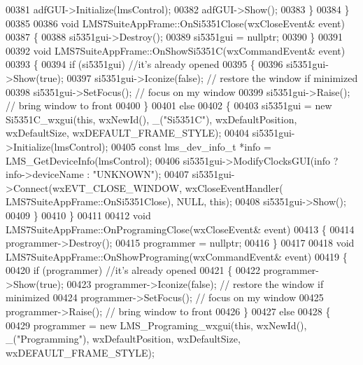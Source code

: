 \begin{DoxyCode}
{{{{00381         adfGUI->Initialize(lmsControl);
00382         adfGUI->Show();
00383     \}
00384 \}
00385 
00386 \textcolor{keywordtype}{void} LMS7SuiteAppFrame::OnSi5351Close(wxCloseEvent& event)
00387 \{
00388     si5351gui->Destroy();
00389     si5351gui = \textcolor{keyword}{nullptr};
00390 \}
00391 
00392 \textcolor{keywordtype}{void} LMS7SuiteAppFrame::OnShowSi5351C(wxCommandEvent& event)
00393 \{
00394     \textcolor{keywordflow}{if} (si5351gui) \textcolor{comment}{//it's already opened}
00395     \{
00396         si5351gui->Show(\textcolor{keyword}{true});
00397         si5351gui->Iconize(\textcolor{keyword}{false}); \textcolor{comment}{// restore the window if minimized}
00398         si5351gui->SetFocus();  \textcolor{comment}{// focus on my window}
00399         si5351gui->Raise();  \textcolor{comment}{// bring window to front}
00400     \}
00401     \textcolor{keywordflow}{else}
00402     \{
00403         si5351gui = \textcolor{keyword}{new} Si5351C_wxgui(\textcolor{keyword}{this}, wxNewId(), \_(\textcolor{stringliteral}{"Si5351C"}), wxDefaultPosition, wxDefaultSize, 
      wxDEFAULT\_FRAME\_STYLE);
00404         si5351gui->Initialize(lmsControl);
00405         \textcolor{keyword}{const} lms_dev_info_t *info = LMS_GetDeviceInfo(lmsControl);
00406         si5351gui->ModifyClocksGUI(info ? info->deviceName : \textcolor{stringliteral}{"UNKNOWN"});
00407         si5351gui->Connect(wxEVT\_CLOSE\_WINDOW, wxCloseEventHandler(
      LMS7SuiteAppFrame::OnSi5351Close), NULL, \textcolor{keyword}{this});
00408         si5351gui->Show();
00409     \}
00410 \}
00411 
00412 \textcolor{keywordtype}{void} LMS7SuiteAppFrame::OnProgramingClose(wxCloseEvent& event)
00413 \{
00414     programmer->Destroy();
00415     programmer = \textcolor{keyword}{nullptr};
00416 \}
00417 
00418 \textcolor{keywordtype}{void} LMS7SuiteAppFrame::OnShowPrograming(wxCommandEvent& event)
00419 \{
00420     \textcolor{keywordflow}{if} (programmer) \textcolor{comment}{//it's already opened}
00421     \{
00422         programmer->Show(\textcolor{keyword}{true});
00423         programmer->Iconize(\textcolor{keyword}{false}); \textcolor{comment}{// restore the window if minimized}
00424         programmer->SetFocus();  \textcolor{comment}{// focus on my window}
00425         programmer->Raise();  \textcolor{comment}{// bring window to front}
00426     \}
00427     \textcolor{keywordflow}{else}
00428     \{
00429         programmer = \textcolor{keyword}{new} LMS_Programing_wxgui(\textcolor{keyword}{this}, wxNewId(), \_(\textcolor{stringliteral}{"Programming"}), wxDefaultPosition, 
      wxDefaultSize, wxDEFAULT\_FRAME\_STYLE);
}}}}
\end{DoxyCode}
